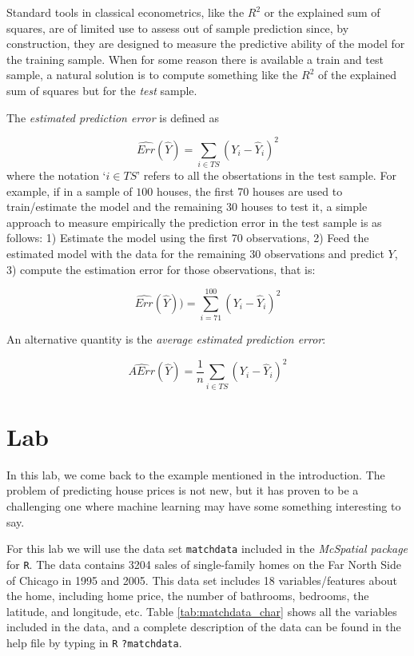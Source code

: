 Standard tools in classical econometrics, like the $R^2$ or the explained sum of squares, are of limited use to assess out of sample prediction since, by construction, they are designed to measure the predictive ability of the model for the training sample. When for some reason there is available a train and test sample, a natural solution is to compute something like the $R^2$ of the explained sum of squares but for the \emph{test} sample.

The \emph{estimated prediction error} is defined as

\[ \hat{Err}(\hat Y) = \sum_{i \in TS} \left(Y_i - \hat Y_i \right)^2\] 
where the notation `$i \in TS$' refers to all the obsertations in the test sample. For example, if in a sample of $100$ houses, the first 70 houses are used to train/estimate the model and the remaining 30 houses to test it, a simple approach to measure empirically the prediction error in the test sample is as follows: 1) Estimate the model using the first 70 observations, 2) Feed the estimated model with the data for the remaining 30 observations and predict $Y$, 3) compute the estimation error for those observations, that is:



\[ \widehat{Err} (\hat Y))  = \sum_{i=71}^{100} \left(Y_i -\hat Y_i \right)^2\]

An alternative quantity is the \emph{average estimated prediction error}: 

\[ \widehat{AErr}(\hat Y) = \frac 1 n  \sum_{i \in TS} \left(Y_i - \hat Y_i \right)^2\] 





\section{Lab}

In this lab, we come back to the example mentioned in the introduction.
The problem of predicting house prices is not new, but it has proven to
be a challenging one where machine learning may have some something
interesting to say.

For this lab we will use the data set \texttt{matchdata} included in the
\emph{McSpatial package} \cite{mcmspatial} for \texttt{R}. The data
contains 3204 sales of single-family homes on the Far North Side
of Chicago in 1995 and 2005. This data set includes 18
variables/features about the home, including home price, the number of bathrooms, bedrooms, the latitude, and longitude,
etc. Table \ref{tab:matchdata_char} shows all the variables included in
the data, and a complete description of the data can be found in the
help file by typing in \texttt{R} \texttt{?matchdata}.

